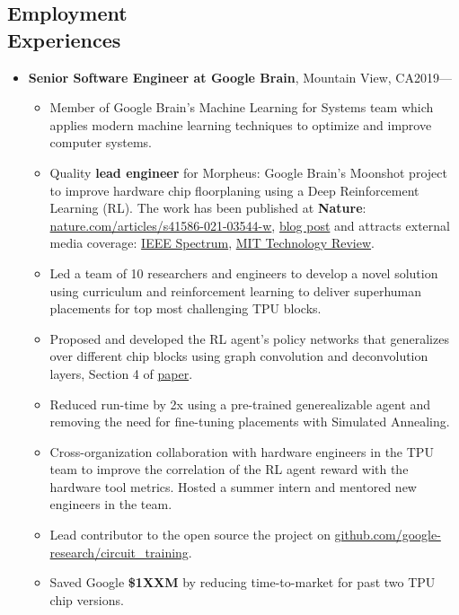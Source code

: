 \documentclass[overlapped]{res}
\begin{document}
\begin{resume}
\section{Employment\\ Experiences}
\begin{itemize}
\item {\bf Senior Software Engineer at Google Brain}, Mountain View, CA\hfill 2019---
\begin{itemize}
\item{Member of Google Brain's Machine Learning for Systems team which applies modern machine learning techniques to optimize and improve computer systems.}
\item{Quality {\bf lead engineer} for Morpheus: Google Brain's Moonshot project to improve hardware chip floorplaning using a Deep Reinforcement Learning (RL). The work has been published at {\bf Nature}: \href{https://www.nature.com/articles/s41586-021-03544-w}{nature.com/articles/s41586-021-03544-w}, \href{https://ai.googleblog.com/2020/04/chip-design-with-deep-reinforcement.html}{blog post} and attracts external media coverage: \href{https://spectrum.ieee.org/tech-talk/semiconductors/design/google-invents-ai-that-learns-a-key-part-of-chip-design}{IEEE Spectrum}, \href{https://www.technologyreview.com/2020/03/27/950258/google-ai-chip-design-reinforcement-learning/}{MIT Technology Review}.}
\item{Led a team of 10 researchers and engineers to develop a novel solution using curriculum and reinforcement learning to deliver superhuman placements for top most challenging TPU blocks.}
\item{Proposed and developed the RL agent's policy networks that generalizes over different chip blocks using graph convolution and deconvolution layers, Section 4 of \href{https://www.nature.com/articles/s41586-021-03544-w}{paper}.}
\item{Reduced run-time by 2x using a pre-trained generealizable agent and removing the need for fine-tuning placements with Simulated Annealing.}
\item{Cross-organization collaboration with hardware engineers in the TPU team to improve the correlation of the RL agent reward with the hardware tool metrics. Hosted a summer intern and mentored new engineers in the team.}
\item{Lead contributor to the open source the project on \href{https://github.com/google-research/circuit_training}{github.com/google-research/circuit\_training}.}
\item{Saved Google {\bf \$1XXM} by reducing time-to-market for past two TPU chip versions.}

\end{itemize}
\end{itemize}
\end{resume}
\end{document}
